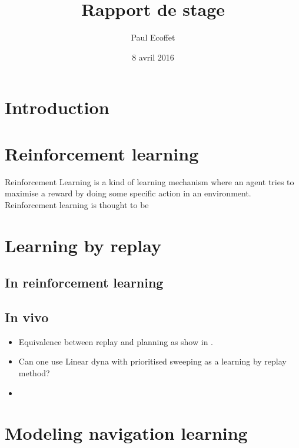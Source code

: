 \documentclass[]{report}
\title{Rapport de stage}
\author{Paul Ecoffet}
\date{8 avril 2016}
\begin{document}
\maketitle

{
\hypersetup{linkcolor=black}
\setcounter{tocdepth}{3}
\tableofcontents
}
\section{Introduction}\label{introduction}

\section{Reinforcement learning}\label{reinforcement-learning}

Reinforcement Learning is a kind of learning mechanism where an agent tries to maximise a reward by doing some specific action in an environment. Reinforcement learning is thought to be

\section{Learning by replay}\label{learning-by-replay}

\subsection{In reinforcement learning}
\label{sub:In reinforcement learning}

\subsection{In vivo}
\label{sub:In vivo}



\begin{itemize}
\itemsep1pt\parskip0pt
\item
  Equivalence between replay and planning as show in \cite{vanseijen_deeper_2015}.
\item
  Can one use Linear dyna with prioritised sweeping as a learning by replay method?
\item

\end{itemize}

\section{Modeling navigation
learning}\label{modeling-navigation-learning}
\end{document}
